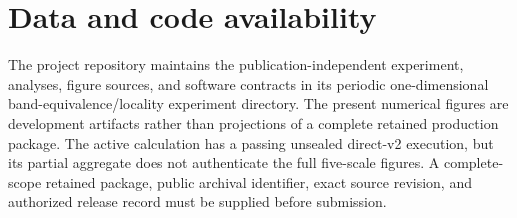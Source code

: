 \documentclass[aps,prb,reprint,amsmath,amssymb,longbibliography,floatfix]{revtex4-2}
\begin{document}
\section*{Data and code availability}
The project repository maintains the publication-independent experiment, analyses,
figure sources, and software contracts in its periodic one-dimensional
band-equivalence/locality experiment directory. The present numerical figures are development artifacts rather than projections of a
complete retained production package. The active calculation has a passing unsealed
direct-v2 execution, but its partial aggregate does not authenticate the full five-scale
figures. A complete-scope retained package, public archival identifier, exact source
revision, and authorized release record must be supplied before submission.



\end{document}
